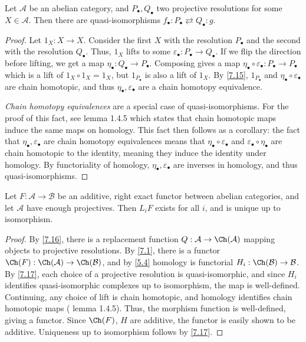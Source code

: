 \begin{lemma}\label{7.17}
	Let $\mathcal{A} $ be an abelian category, and $P_{\bullet} ,Q_{\bullet} $ two projective resolutions for some $X\in \mathcal{A} $. Then there are quasi-isomorphisms $f_{\bullet} : P_{\bullet} \rightleftarrows Q _{\bullet} : g$.
\end{lemma}
\begin{proof}
	Let $1_X : X \to X$. Consider the first $X$ with the resolution $P_{\bullet} $ and the second with the resolution $Q_{\bullet} $. Thus, $1_X$ lifts to some $\varepsilon _{\bullet} : P_{\bullet}  \to Q_{\bullet} $. If we flip the direction before lifting, we get a map $\eta _{\bullet} : Q_{\bullet}  \to P_{\bullet} $. Composing gives a map $\eta_{\bullet}  \circ \varepsilon_{\bullet}  : P_{\bullet}  \to P_{\bullet} $ which is a lift of $1_X \circ 1_X = 1_X$, but $1_{P_{\bullet} } $ is also a lift of $1_X$. By \cref{7.15}, $1_{P_{\bullet} } $ and $\eta_{\bullet}  \circ \varepsilon_{\bullet}  $ are chain homotopic, and thus $\eta _{\bullet} ,\varepsilon _{\bullet} $ are a chain homotopy equivalence.

	\emph{Chain homotopy equivalences} are a special case of quasi-isomorphisms. For the proof of this fact, see \cite[1.4]{weibel} lemma 1.4.5 which states that chain homotopic maps induce the same maps on homology. This fact then follows as a corollary: the fact that $\eta _{\bullet} ,\varepsilon _{\bullet} $ are chain homotopy equivalences means that $\eta _{\bullet} \circ \varepsilon _{\bullet} $ and $\varepsilon _{\bullet} \circ \eta _{\bullet} $ are chain homotopic to the identity, meaning they induce the identity under homology. By functoriality of homology, $\eta _{\bullet} ,\varepsilon _{\bullet} $ are inverses in homology, and thus quasi-isomorphisms.	
\end{proof}

\begin{theorem}\label{7.18}
	Let $F : \mathcal{A}  \to \mathcal{B} $ be an additive, right exact functor between abelian categories, and let $\mathcal{A}  $ have enough projectives. Then $L_iF$ exists for all $i$, and is unique up to isomorphism.
\end{theorem}
\begin{proof}
	By \cref{7.16}, there is a replacement function $Q:\mathcal{A} \to \Ch(\mathcal{A} ) $ mapping objects to projective resolutions. By \cref{7.1}, there is a functor $\Ch(F) : \Ch(\mathcal{A} )  \to \Ch(\mathcal{B} ) $, and by \cref{5.4} homology is functorial $H_i : \Ch(\mathcal{B} )  \to \mathcal{B} $. By \cref{7.17}, each choice of a projective resolution is quasi-isomorphic, and since $H_i$ identifies quasi-isomorphic complexes up to isomorphism, the map is well-defined. Continuing, any choice of lift is chain homotopic, and homology identifies chain homotopic maps (\cite[1.4]{weibel} lemma 1.4.5). Thus, the morphism function is well-defined, giving a functor. Since $\Ch(F) $, $H$ are additive, the functor is easily shown to be additive. Uniqueness up to isomorphism follows by \cref{7.17}.
\end{proof}

